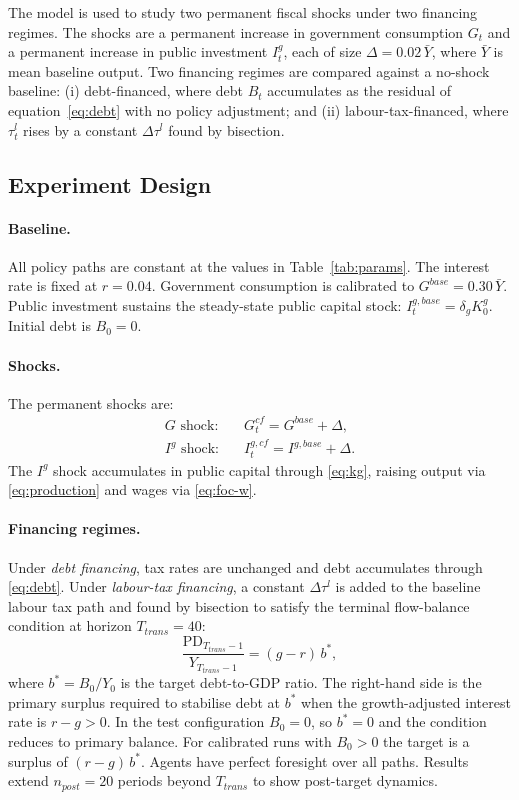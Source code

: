 The model is used to study two permanent fiscal shocks under two financing regimes. The shocks are a permanent increase in government consumption $G_t$ and a permanent increase in public investment $I_t^g$, each of size $\Delta = 0.02\,\bar{Y}$, where $\bar{Y}$ is mean baseline output. Two financing regimes are compared against a no-shock baseline: (i) debt-financed, where debt $B_t$ accumulates as the residual of equation~\eqref{eq:debt} with no policy adjustment; and (ii) labour-tax-financed, where $\tau^l_t$ rises by a constant $\Delta\tau^l$ found by bisection.

\subsection{Experiment Design}

\paragraph{Baseline.} All policy paths are constant at the values in Table~\ref{tab:params}. The interest rate is fixed at $r = 0.04$. Government consumption is calibrated to $G^{base} = 0.30\,\bar{Y}$. Public investment sustains the steady-state public capital stock: $I_t^{g,base} = \delta_g K_0^g$. Initial debt is $B_0 = 0$.

\paragraph{Shocks.} The permanent shocks are:
\begin{align}
G\text{ shock:} \quad & G_t^{cf} = G^{base} + \Delta, \label{eq:G-shock}\\
I^g\text{ shock:} \quad & I_t^{g,cf} = I^{g,base} + \Delta. \label{eq:Ig-shock}
\end{align}
The $I^g$ shock accumulates in public capital through \eqref{eq:kg}, raising output via \eqref{eq:production} and wages via \eqref{eq:foc-w}.

\paragraph{Financing regimes.} Under \emph{debt financing}, tax rates are unchanged and debt accumulates through \eqref{eq:debt}. Under \emph{labour-tax financing}, a constant $\Delta\tau^l$ is added to the baseline labour tax path and found by bisection to satisfy the terminal flow-balance condition at horizon $T_{trans} = 40$:
\begin{equation}\label{eq:balance-condition}
\frac{\text{PD}_{T_{trans}-1}}{Y_{T_{trans}-1}} = (g - r)\,b^*,
\end{equation}
where $b^* = B_0/Y_0$ is the target debt-to-GDP ratio. The right-hand side is the primary surplus required to stabilise debt at $b^*$ when the growth-adjusted interest rate is $r - g > 0$. In the test configuration $B_0 = 0$, so $b^* = 0$ and the condition reduces to primary balance. For calibrated runs with $B_0 > 0$ the target is a surplus of $(r-g)\,b^*$. Agents have perfect foresight over all paths. Results extend $n_{post} = 20$ periods beyond $T_{trans}$ to show post-target dynamics.

